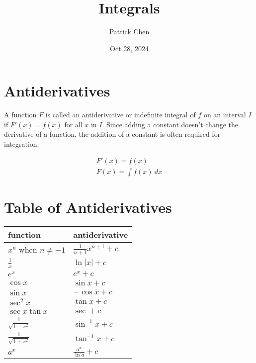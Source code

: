 \documentclass{article}
\title{Integrals}
\author{Patrick Chen}
\date{Oct 28, 2024}
\theoremstyle{mytheoremstyle}
\theoremstyle{mytheoremstyle}
\theoremstyle{myproblemstyle}
\begin{document}
    \maketitle
    \section*{Antiderivatives}
    A function $F$ is called an antiderivative or indefinite integral of $f$ on
    an interval $I$ if $F'(x)=f(x)$ for all $x$ in $I$. Since adding a constant
    doesn't change the derivative of a function, the addition of a constant is
    often required for integration.

    \begin{align*}
        F'(x) = f(x) \\
        F(x) = \int f(x) \ dx
    \end{align*}

    \section*{Table of Antiderivatives}
    \begin{center}
        \renewcommand{\arraystretch}{2}
        \begin{tabular}[c]{l|l}
            \hline
            function & antiderivative \\
            \hline
            $x^n$ when $n\ne -1$ & $\frac{1}{n+1} x^{n+1} + c$ \\
            \hline
            $\frac{1}{x}$ & $\ln |x| + c$ \\
            \hline
            $e^x$ & $e^x + c$ \\
            \hline
            $\cos x$ & $\sin x + c$ \\
            \hline
            $\sin x$ & $-\cos x + c$ \\
            \hline
            $\sec^2 x$ & $\tan x + c$ \\
            \hline
            $\sec x \tan x$ & $\sec + c$ \\
            \hline
            $\frac{1}{\sqrt{1-x^2}}$ & $\sin^{-1} x + c$ \\
            \hline
            $\frac{1}{\sqrt{1+x^2}}$ & $\tan^{-1} x + c$ \\
            \hline
            $a^x$ & $\frac{a^x}{\ln a} + c$ \\
            \hline
        \end{tabular}
    \end{center}
\end{document}
